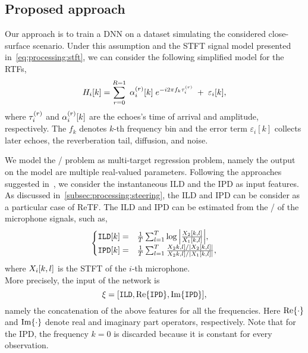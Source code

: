 \subsection{Proposed approach}\label{subsec:lantern:simple:mpl}
Our approach is to train a \ac{DNN} on a dataset simulating the considered close-surface scenario.
Under this assumption and the \acf{STFT} signal model presented in~\cref{eq:processing:stft}, we can consider the following simplified model for the \acfp{RTF},
\begin{equation}\label{eq:mirage:rir}
    H_{i}[k] = \sum_{r=0}^{R=1}  \; \alpha_{i}^{(r)}[k] \; {e}^{- {i} 2 \pi f_k \tau_{i}^{(r)}} \; + \; \varepsilon_{i}[k],
\end{equation}
where $\tau_{i}^{(r)}$ and $\alpha_{i}^{(r)}[k]$ are the echoes's time of arrival and amplitude, respectively.
The $f_k$ denotes $k$-th frequency bin and the error term $\varepsilon_i[k]$ collects later echoes, the reverberation tail, diffusion, and noise.

\mynewline
We model the \AER/ problem as multi-target regression problem, namely the output on the model are multiple real-valued parameters.
Following the approaches suggested in~, we consider the instantaneous \acf{ILD} and the \ac{IPD} as input features.
As discussed in~\cref{subsec:processing:steering}, the \ac{ILD} and \ac{IPD} can be consider as a particular case of \acf{ReTF}.
The \ac{ILD} and \ac{IPD} can be estimated from the \STFT/ of the microphone signals, such as,
\begin{equation} \label{eq:mirage:features}
\begin{cases}
    \ild[k]  =& \tfrac{1}{T} \sum_{l=1}^T \log{\abs{\frac{\MIC_2[k,l]}{\MIC_1[k,l]}}}, \\
    \ipd[k]  =& \tfrac{1}{T} \sum_{l=1}^T \frac{\MIC_2k,l]/ \abs{\MIC_2[k,l]}}{ \MIC_2k,l] / \abs{\MIC_1[k,l]}},\\
\end{cases}
\end{equation}
where $X_i[k,l]$ is the \ac{STFT} of the $i$-th microphone.
\\More precisely, the input of the network is
\begin{equation*}
    \xi = \klist{ \ild, \kRe\set{\ipd}, \kIm\set{\ipd}}
    ,
\end{equation*}
namely the concatenation of the above features for all the frequencies.
Here $\kRe\set{\cdot}$ and $\kIm\set{\cdot}$ denote real and imaginary part operators, respectively.
Note that for the \ac{IPD}, the frequency $k=0$ is discarded because it is constant for every observation.

